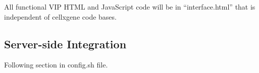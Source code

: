 \documentclass[
]{article}
\newenvironment{Shaded}{\begin{snugshade}}{\end{snugshade}}
\newcommand{\AttributeTok}[1]{\textcolor[rgb]{0.77,0.63,0.00}{#1}}
\newcommand{\DataTypeTok}[1]{\textcolor[rgb]{0.13,0.29,0.53}{#1}}
\newcommand{\ExtensionTok}[1]{#1}
\newcommand{\FunctionTok}[1]{\textcolor[rgb]{0.00,0.00,0.00}{#1}}
\newcommand{\NormalTok}[1]{#1}
\newcommand{\OperatorTok}[1]{\textcolor[rgb]{0.81,0.36,0.00}{\textbf{#1}}}
\newcommand{\StringTok}[1]{\textcolor[rgb]{0.31,0.60,0.02}{#1}}
\newcommand{\VariableTok}[1]{\textcolor[rgb]{0.00,0.00,0.00}{#1}}
\begin{document}
\begin{Shaded}
\end{Shaded}

All functional VIP HTML and JavaScript code will be in ``interface.html'' that is independent of cellxgene code bases.

\hypertarget{server-side-integration}{%
\subsection*{Server-side Integration}\label{server-side-integration}}

Following section in config.sh file.
\end{document}
